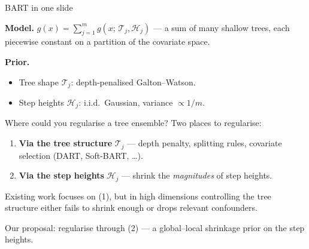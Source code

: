 \documentclass[10pt,aspectratio=169]{beamer}
\newcommand{\T}{\mathcal{T}}
\newcommand{\Hh}{\mathcal{H}}
\begin{document}
\begin{frame}{BART in one slide}
\vspace{0.2cm}

\textbf{Model.} $g(x) = \sum_{j=1}^{m} g(x;\, \T_j, \Hh_j)$ --- a sum of many shallow trees, each piecewise constant on a partition of the covariate space.

\vspace{0.3cm}

\textbf{Prior.}
\begin{itemize}
  \item Tree shape $\T_j$: depth-penalised Galton--Watson.
  \item Step heights $\Hh_j$: i.i.d.\ Gaussian, variance $\propto 1/m$.
\end{itemize}
\end{frame}

\begin{frame}{Where could you regularise a tree ensemble?}
Two places to regularise:

\bigskip

\begin{enumerate}
  \item \textbf{Via the tree structure} $\T_j$ --- depth penalty, splitting rules, covariate selection (DART, Soft-BART, \ldots).
  \bigskip
  \item \textbf{Via the step heights} $\Hh_j$ --- shrink the \emph{magnitudes} of step heights.
\end{enumerate}

\bigskip

Existing work focuses on (1), but in high dimensions controlling the tree structure either fails to shrink enough or drops relevant confounders.

\bigskip

\alert{Our proposal: regularise through (2) --- a global--local shrinkage prior on the step heights.}
\end{frame}
\end{document}
